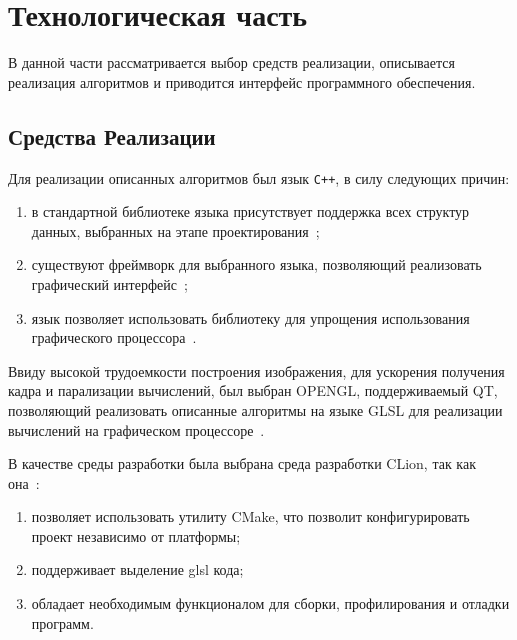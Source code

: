 \chapter{Технологическая часть}
В данной части рассматривается выбор средств реализации, описывается реализация алгоритмов и приводится интерфейс программного
обеспечения.




\section{Средства Реализации}
Для реализации описанных алгоритмов был язык \texttt{C++}, в силу следующих причин:
\begin{enumerate}
	\item в стандартной библиотеке языка присутствует поддержка всех структур данных,
	выбранных на этапе проектирования~\cite{STL};
	\item существуют фреймворк для выбранного языка, позволяющий реализовать графический интерфейс~\cite{qt_c++};
	\item язык позволяет использовать библиотеку для упрощения использования графического процессора~\cite{qt_opengl}.
\end{enumerate}


Ввиду высокой трудоемкости построения изображения, для ускорения получения кадра и
парализации вычислений, был выбран OPENGL, поддерживаемый QT, позволяющий реализовать описанные алгоритмы на языке GLSL для реализации вычислений на графическом процессоре~\cite{ray_trace_glsl}.

В качестве среды разработки была выбрана среда разработки  CLion, так как она~\cite{clion}:
\begin{enumerate}
    \item позволяет использовать утилиту CMake, что позволит конфигурировать проект независимо от платформы;
    \item поддерживает выделение glsl кода;
    \item обладает необходимым функционалом для сборки, профилирования и отладки программ.
\end{enumerate}


